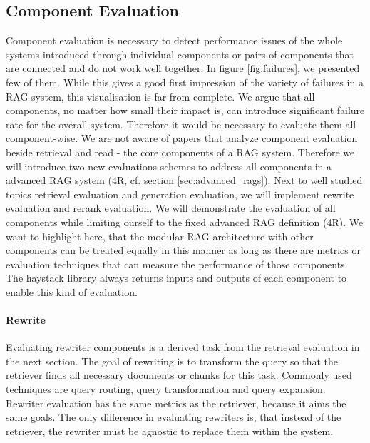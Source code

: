 

\subsection{Component Evaluation}

Component evaluation is necessary to detect performance issues of the whole systems introduced through individual components or pairs of components that are connected and do not work well together.\cite{Salemi.2024} In figure \ref{fig:failures}, we presented few of them. While this gives a good first impression of the variety of failures in a RAG system, this visualisation is far from complete. We argue that all components, no matter how small their impact is, can introduce significant failure rate for the overall system. Therefore it would be necessary to evaluate them all component-wise. We are not aware of papers that analyze component evaluation beside retrieval and read - the core components of a RAG system. Therefore we will introduce two new evaluations schemes to address all components in a advanced RAG system (4R, cf. section \ref{sec:advanced_rags}). Next to well studied topics retrieval evaluation and generation evaluation, we will implement rewrite evaluation and rerank evaluation. We will demonstrate the evaluation of all components while limiting ourself to the fixed advanced RAG definition (4R). We want to highlight here, that the modular RAG architecture with other components can be treated equally in this manner as long as there are metrics or evaluation techniques that can measure the performance of those components. The haystack library always returns inputs and outputs of each component to enable this kind of evaluation.

\paragraph{Rewrite}

Evaluating rewriter components is a derived task from the retrieval evaluation in the next section. The goal of rewriting is to transform the query so that the retriever finds all necessary documents or chunks for this task. Commonly used techniques are query routing, query transformation and query expansion. Rewriter evaluation has the same metrics as the retriever, because it aims the same goals. The only difference in evaluating rewriters is, that instead of the retriever, the rewriter must be agnostic to replace them within the system. 

